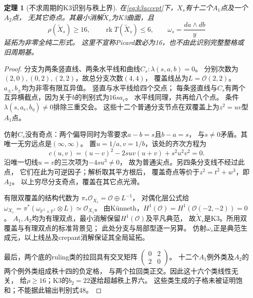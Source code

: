 \documentclass[11pt,a4paper]{ctexart}
\theoremstyle{cnplain}\newtheorem{theorem}{定理}[section]
\theoremstyle{definition}\newtheorem{definition}[theorem]{定义}
\theoremstyle{remark}\newtheorem{remark}[theorem]{注}
\newcommand{\rk}{\operatorname{rk}}\newcommand{\im}{\operatorname{im}}
\begin{document}
\begin{theorem}[不求周期的K3识别与秩上界]\label{thm:spectralk3}
在\eqref{eq:k3accept}下，$X_s$有十二个$A_1$点及一个$A_2$点，
无其它奇点。其最小消解$\widetilde X_s$为K3曲面，且
\[
 \rho(\widetilde X_s)\ge16,\qquad
 \rk T(\widetilde X_s)\le6,\qquad
 \omega_s=\frac{da\wedge db}{y}
\]
延拓为非零全纯二形式。
这里不宣称Picard数必为16，也不由此识别完整整格或旧周期基。
\end{theorem}
\begin{proof}
分支为两条竖直线、两条水平线和曲线$C_s:\lambda(s,a,b)=0$。
分别次数为$(2,0),(0,2),(2,2)$，故总分支次数$(4,4)$，
覆盖线丛为$L=\mathcal O(2,2)$。
$a_\pm,b_\pm$均为非零有限互异值。
竖直与水平线给四个交点；
每条竖直线与$C_s$有两个互异横截点，因为关于$b$的判别式为$16sa_\epsilon$。
水平线同理，共再给八个点。
条件$\lambda(s,a_\epsilon,b_\eta)\ne0$排除三重交会。
这些十二个普通分支节点在双覆盖上为$z^2=uv$型$A_1$点。

仿射$C_s$没有奇点：两个偏导同时为零要求$a-b=s$且$b-a=s$，
与$s\ne0$矛盾。其唯一无穷远点是$(\infty,\infty)$。
置$u=1/a,v=1/b$，该处的齐次方程为
\[
 c(u,v)=(u-v)^2-2suv(u+v)+s^2u^2v^2=0.
\]
沿唯一切线$u=v$的三次项为$-4su^3\ne0$，
故为普通尖点。另四条分支线不经过此点，
它们在此为可逆因子；解析取其平方根后，
覆盖奇点等价于$z^2=t^2+w^3$，即$A_2$。
以上穷尽分支奇点，覆盖在其它点光滑。

有限双覆盖的结构代数为
$\pi_*\mathcal O_{X_s}=\mathcal O\oplus L^{-1}$，
对偶化层公式给
$\omega_{X_s}=\pi^*(\omega_{\mathbb P^1\times\mathbb P^1}\otimes L)
\simeq\mathcal O_{X_s}$。
由Künneth，$H^1(\mathcal O)=H^1(\mathcal O(-2,-2))=0$。
$A_1,A_2$均为有理双点，最小消解保留$H^1(\mathcal O)$及平凡典范，
故$\widetilde X_s$是K3。所用双覆盖与有理双点的标准背景见\cite{HuyK3}；
此处分支与局部型逐一另算。
仿射$\omega_s$正是典范生成元，以上线丛及crepant消解保证其全局延拓。

最后，两个底的ruling类的拉回具有交叉矩阵
$\left(\begin{smallmatrix}0&2\\2&0\end{smallmatrix}\right)$。
十二个$A_1$例外类及$A_2$的两个例外类组成秩十四的负定格，
与两个拉回类正交。因此这十六个类线性无关，
给$\rho\ge16$；K3的$b_2=22$遂给超越秩上界六。
这些类生成的子格未被证明饱和；不能据此输出判别式48。
\end{proof}
\end{document}
